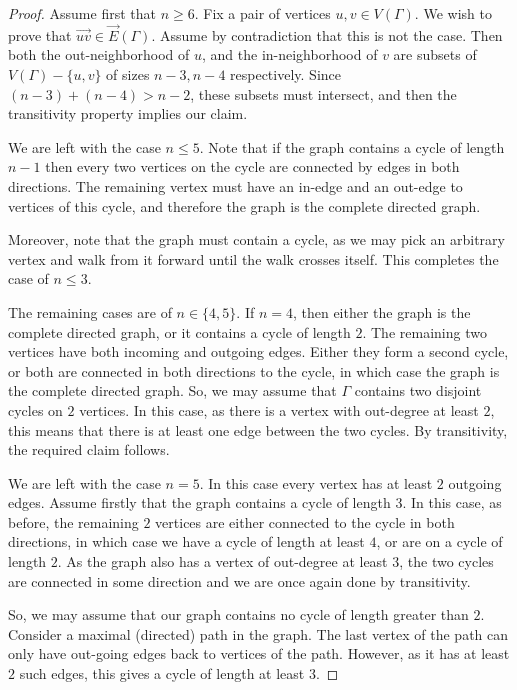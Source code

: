 \documentclass[letterpaper]{amsart}
\begin{document}
\begin{proof}
Assume first that $n \geq 6$. Fix a pair of vertices $u, v \in V(\Gamma)$. We wish to prove that $\vec{uv} \in \vec{E}(\Gamma).$ Assume by contradiction that this is not the case.
Then both the out-neighborhood of $u$, and the in-neighborhood of $v$ are subsets of $V(\Gamma) - \{u, v\}$ of sizes $n-3, n-4$ respectively. Since $(n - 3) + (n - 4) > n - 2$, these subsets must intersect, and then the transitivity property implies our claim.

We are left with the case $n \leq 5$. Note that if the graph contains a cycle of length $n - 1$ then every two vertices on the cycle are connected by edges in both directions. The remaining vertex must have an in-edge and an out-edge to vertices of this cycle, and therefore the graph is the complete directed graph.

Moreover, note that the graph must contain a cycle, as we may pick an arbitrary vertex and walk from it forward until the walk crosses itself. This completes the case of $n \leq 3$.

The remaining cases are of $n \in \{4, 5\}$.
If $n = 4$, then either the graph is the complete directed graph, or it contains a cycle of length $2$. The remaining two vertices have both incoming and outgoing edges. Either they form a second cycle, or both are connected in both directions to the cycle, in which case the graph is the complete directed graph.
So, we may assume that $\Gamma$ contains two disjoint cycles on $2$ vertices. In this case, as there is a vertex with out-degree at least $2$, this means that there is at least one edge between the two cycles. By transitivity, the required claim follows.

We are left with the case $n = 5$. In this case every vertex has at least $2$ outgoing edges. Assume firstly that the graph contains a cycle of length $3$. In this case, as before, the remaining $2$ vertices are either connected to the cycle in both directions, in which case we have a cycle of length at least $4$, or are on a cycle of length $2$. As the graph also has a vertex of out-degree at least $3$, the two cycles are connected in some direction and we are once again done by transitivity.

So, we may assume that our graph contains no cycle of length greater than $2$. Consider a maximal (directed) path in the graph. The last vertex of the path can only have out-going edges back to vertices of the path. However, as it has at least $2$ such edges, this gives a cycle of length at least $3$.
\end{proof}
\end{document}
